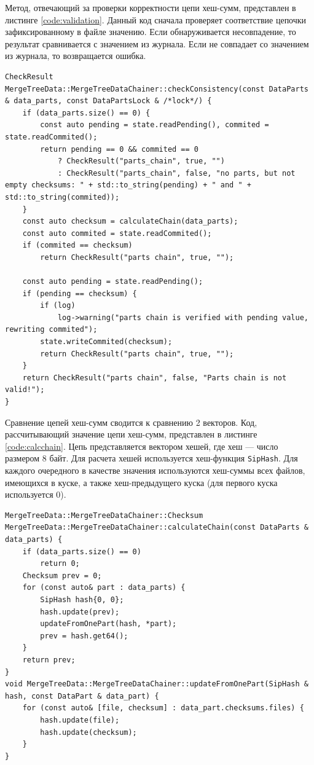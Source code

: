 Метод, отвечающий за проверки корректности цепи хеш-сумм, представлен в листинге \ref{code:validation}. Данный код сначала проверяет соответствие цепочки зафиксированному в файле значению. Если обнаруживается несовпадение, то результат сравнивается с значением из журнала. Если не совпадает со значением из журнала, то возвращается ошибка.

\pagebreak

\begin{lstlisting}[label=code:validation, caption={Валидация цепи хеш-сумм.}]
CheckResult MergeTreeData::MergeTreeDataChainer::checkConsistency(const DataParts & data_parts, const DataPartsLock & /*lock*/) {
    if (data_parts.size() == 0) {
        const auto pending = state.readPending(), commited = state.readCommited();
        return pending == 0 && commited == 0
            ? CheckResult("parts_chain", true, "")
            : CheckResult("parts_chain", false, "no parts, but not empty checksums: " + std::to_string(pending) + " and " + std::to_string(commited));
    }
    const auto checksum = calculateChain(data_parts);
    const auto commited = state.readCommited();
    if (commited == checksum)
        return CheckResult("parts chain", true, "");

    const auto pending = state.readPending();
    if (pending == checksum) {
        if (log)
            log->warning("parts chain is verified with pending value, rewriting commited");
        state.writeCommited(checksum);
        return CheckResult("parts chain", true, "");
    }
    return CheckResult("parts chain", false, "Parts chain is not valid!");
}
\end{lstlisting}

Сравнение цепей хеш-сумм сводится к сравнению 2 векторов. Код, рассчитывающий значение цепи хеш-сумм, представлен в листинге \ref{code:calcchain}. Цепь представляется вектором хешей, где хеш --- число размером 8 байт. Для расчета хешей используется хеш-функция \texttt{SipHash}. Для каждого очередного в качестве значения используются хеш-суммы всех файлов, имеющихся в куске, а также хеш-предыдущего куска (для первого куска используется 0).

\pagebreak

\begin{lstlisting}[label=code:calcchain, caption={Расчет цепи хеш-сумм.}]
MergeTreeData::MergeTreeDataChainer::Checksum
MergeTreeData::MergeTreeDataChainer::calculateChain(const DataParts & data_parts) {
    if (data_parts.size() == 0)
        return 0;
    Checksum prev = 0;
    for (const auto& part : data_parts) {
        SipHash hash{0, 0};
        hash.update(prev);
        updateFromOnePart(hash, *part);
        prev = hash.get64();
    }
    return prev;
}
void MergeTreeData::MergeTreeDataChainer::updateFromOnePart(SipHash & hash, const DataPart & data_part) {
    for (const auto& [file, checksum] : data_part.checksums.files) {
        hash.update(file);
        hash.update(checksum);
    }
}
\end{lstlisting}


